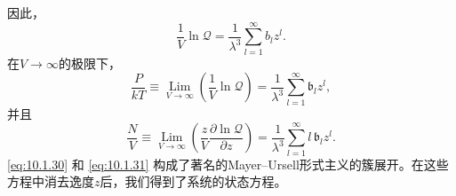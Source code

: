 因此，
\begin{equation}\tag{10.1.29}\label{eq:10.1.29}
\frac { 1 } { V } \ln \mathcal { Q } = \frac { 1 } { \lambda ^{3} } \sum _ { l = 1 } ^{\infty} b _ { l } z ^{l} .
\end{equation}
在\(V \rightarrow \infty\)的极限下，
\begin{equation}\tag{10.1.30}\label{eq:10.1.30}
\frac { P } { k T } \equiv \operatorname* { L i m } _ { V \to \infty } \left( \frac { 1 } { V } \ln \mathcal { Q } \right) = \frac { 1 } { \lambda ^{3} } \sum _ { l = 1 } ^{\infty} \mathfrak { b } _ { l } z ^{l} ,
\end{equation}
并且
\begin{equation}\tag{10.1.31}\label{eq:10.1.31}
\frac { N } { V } \equiv \operatorname* { L i m } _ { V \to \infty } \left( \frac { z } { V } \frac { \partial \ln \mathcal { Q } } { \partial z } \right) = \frac { 1 } { \lambda ^{3} } \sum _ { l = 1 } ^{\infty} l \, \mathfrak { b } _ { l } z ^{l} .
\end{equation}
\autoref{eq:10.1.30} 和 \autoref{eq:10.1.31} 构成了著名的Mayer--Ursell形式主义的簇展开。在这些方程中消去逸度\(z\)后，我们得到了系统的状态方程。
